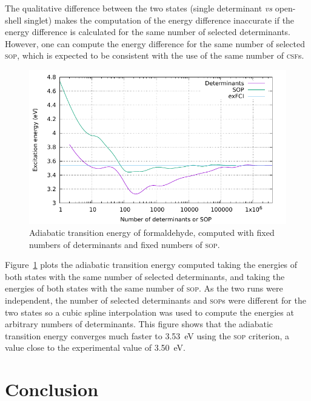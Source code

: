 \documentclass[aip,jcp,reprint,showkeys]{revtex4-1}
\newcommand{\sop}{\textsc{sop}}
\newcommand{\csf}{\textsc{csf}}
\begin{document}
The qualitative difference between the two states (single determinant
\textit{vs} open-shell singlet) makes the computation of
the energy difference inaccurate if the energy difference is calculated for
the same number of selected determinants. 
However, one can compute the energy difference for the same number of selected
\sop, which is expected to be consistent with the use of the same number of
\csf s.

\begin{figure}
\includegraphics[width=0.9\columnwidth]{formaldehyde}
\caption{Adiabatic transition energy of formaldehyde, computed with fixed numbers of 
determinants and fixed numbers of \sop .}
\label{fig:formaldehyde}
\end{figure}

Figure~\ref{fig:formaldehyde} plots the adiabatic transition energy computed
taking the energies of both states with the same number of selected
determinants, and taking the energies of both states with the same number of
\sop{}.
As the two runs were independent, the number of selected determinants and
\sop s were different for the two states so a cubic spline interpolation
was used to compute the energies at arbitrary numbers of determinants.
This figure shows that the adiabatic transition energy converges much
faster to 3.53~eV using the \sop{} criterion, a value close to the
experimental value of 3.50~eV.\cite{Clouthier_1983,Angeli_2005}


\section{Conclusion}
\end{document}

